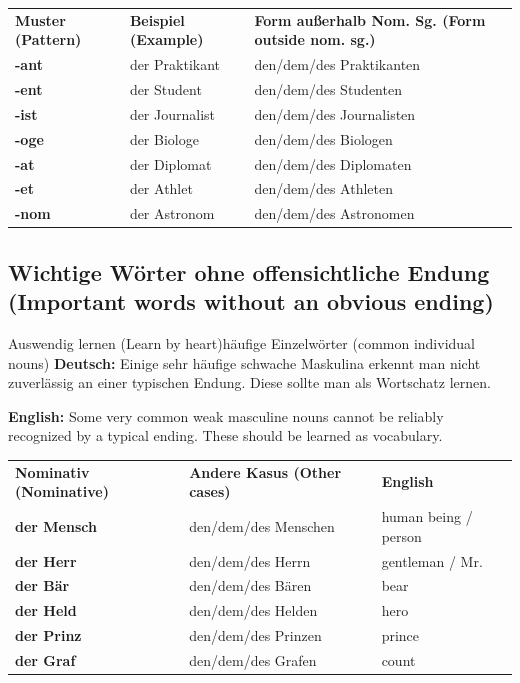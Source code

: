 \documentclass[a4paper,11pt]{article}
\newcommand{\GermanText}[1]{\textbf{Deutsch: }#1\par}
\newcommand{\EnglishText}[1]{{\small\color{SoftGray}\textbf{English: }#1\par}}
\begin{document}
            \begin{longtable}{>{\bfseries}p{3.5cm}|p{4.5cm}|p{6.0cm}}
                \rowcolor{HeaderBlueDark}
                \color{white}\textbf{Muster (Pattern)} & \color{white}\textbf{Beispiel (Example)} & \color{white}\textbf{Form außerhalb Nom. Sg. (Form outside nom. sg.)} \\
                -ant & der Praktikant & den/dem/des Praktikanten \\
                -ent & der Student & den/dem/des Studenten \\
                -ist & der Journalist & den/dem/des Journalisten \\
                -oge & der Biologe & den/dem/des Biologen \\
                -at & der Diplomat & den/dem/des Diplomaten \\
                -et & der Athlet & den/dem/des Athleten \\
                -nom & der Astronom & den/dem/des Astronomen \\
            \end{longtable}

        \subsection{Wichtige Wörter ohne offensichtliche Endung \textnormal{(Important words without an obvious ending)}}

            \begin{grammarentry}{Auswendig lernen \textnormal{(Learn by heart)}}{häufige Einzelwörter \textnormal{(common individual nouns)}}
                \GermanText{Einige sehr häufige schwache Maskulina erkennt man nicht zuverlässig an einer typischen Endung. Diese sollte man als Wortschatz lernen.}
                \EnglishText{Some very common weak masculine nouns cannot be reliably recognized by a typical ending. These should be learned as vocabulary.}
            \end{grammarentry}

            \begin{longtable}{>{\bfseries}p{4.0cm}|p{5.0cm}|p{5.0cm}}
                \rowcolor{HeaderBlueDark}
                \color{white}\textbf{Nominativ (Nominative)} & \color{white}\textbf{Andere Kasus (Other cases)} & \color{white}\textbf{English} \\
                der Mensch & den/dem/des Menschen & human being / person \\
                der Herr & den/dem/des Herrn & gentleman / Mr. \\
                der Bär & den/dem/des Bären & bear \\
                der Held & den/dem/des Helden & hero \\
                der Prinz & den/dem/des Prinzen & prince \\
                der Graf & den/dem/des Grafen & count \\
            \end{longtable}
\end{document}
